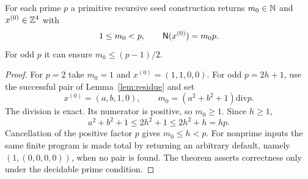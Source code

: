 \begin{proposition}
\label{prop:seed}
For each prime $p$ a primitive recursive seed construction returns
$m_0\in\mathbb N$ and $x^{(0)}\in\mathbb Z^4$ with
\[
 1\le m_0<p,\qquad \mathsf N(x^{(0)})=m_0p.
\]
For odd $p$ it can ensure $m_0\le(p-1)/2$.
\end{proposition}

\begin{proof}
For $p=2$ take $m_0=1$ and $x^{(0)}=(1,1,0,0)$.
For odd $p=2h+1$, use the successful pair of Lemma~\ref{lem:residue} and set
\[
 x^{(0)}=(a,b,1,0),\qquad
 m_0=(a^2+b^2+1)\mathbin{\mathrm{div}}p.
\]
The division is exact. Its numerator is positive, so $m_0\ge1$.
Since $h\ge1$,
\[
 a^2+b^2+1\le2h^2+1\le2h^2+h=hp.
\]
Cancellation of the positive factor $p$ gives $m_0\le h<p$.
For nonprime inputs the same finite program is made total by returning
an arbitrary default, namely $(1,(0,0,0,0))$, when no pair is found.
The theorem asserts correctness only under the decidable prime condition.
\end{proof}
